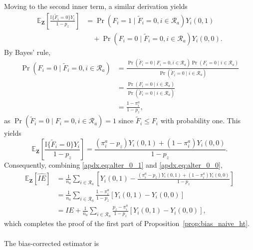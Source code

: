 \documentclass[11pt]{article}
\theoremstyle{definition}
\def \bZ {\boldsymbol{Z}}
\def \cR {\mathcal{R}}
\def \EX {\mathbb{E}}
\begin{document}
\\
\\ 
Moving to the second inner term, a similar derivation yields
\begin{align*}
     \EX_{\bZ}\left[\frac{
    \mathbb{I}\{\widetilde{F}_i=0\}Y_i}{1-p_z} \right]
    &= 
    \Pr(F_i = 1 \mid \widetilde{F}_i=0, i\in \cR_a) Y_i(0,1)
    \\ &\quad +
    \Pr(F_i = 0 \mid \widetilde{F}_i=0, i\in \cR_a) Y_i(0,0).
\end{align*}
By Bayes' rule, 
\begin{align*}
    \Pr(F_i = 0 \mid \widetilde{F}_i=0, i \in \cR_a)
    &= 
    \frac{\Pr(\widetilde{F}_i=0 \mid F_i=0, i \in \cR_a) \Pr(F_i=0 \mid i \in \cR_a)}
    {\Pr(\widetilde{F}_i=0 \mid i \in \cR_a)}
    \\ &= 
    \frac{\Pr(F_i=0 \mid i \in \cR_a)}
    {\Pr(\widetilde{F}_i=0 \mid i \in \cR_a)}
    \\ &=
    \frac{1-\pi^a_i}{1-p_z},
\end{align*}
as $\Pr(\widetilde{F}_i=0 \mid F_i=0, i \in \cR_a) = 1$ since $\widetilde{F}_i \leq F_i$ with probability one.
This yields
\begin{equation}
    \label{apdx.eq:alter_0_0}
     \EX_{\bZ}\left[\frac{
    \mathbb{I}\{\widetilde{F}_i=0\}Y_i}{1-p_z} \right]
    =
    \frac{\left(\pi_i^a -p_z\right)Y_i(0,1) + \left(1 - \pi_i^a\right)Y_i(0,0)}{1 - p_z}.
\end{equation}
Consequently, combining \eqref{apdx.eq:alter_0_1} and \eqref{apdx.eq:alter_0_0},
\begin{equation}
    \label{apdx.eq:alter_bias_ht}
    \begin{aligned}
        \EX_{\bZ}\left[\widehat{IE}\right]
        &= 
         \frac{1}{n_a}
    \sum_{i \in \cR_a}
    \left[
    Y_i(0,1)
    -
   \frac{\left(\pi_i^a -p_z\right)Y_i(0,1) + \left(1 - \pi_i^a\right)Y_i(0,0)}{1 - p_z}
    \right]
    \\ &=
    \frac{1}{n_a}
    \sum_{i \in \cR_a}
    \frac{1-\pi_i^a}{1-p_z}
    \left[
    Y_i(0,1) - Y_i(0,0)
    \right]
    \\ &=
    IE + \frac{1}{n_a}
    \sum_{i \in \cR_a}
    \frac{p_z-\pi_i^a}{1-p_z}
    \left[
    Y_i(0,1) - Y_i(0,0)
    \right],
    \end{aligned}
\end{equation}
which completes the proof of the first part of Proposition~\ref{prop:bias_naive_ht}.
\\
\\
The bias-corrected estimator is
\end{document}
